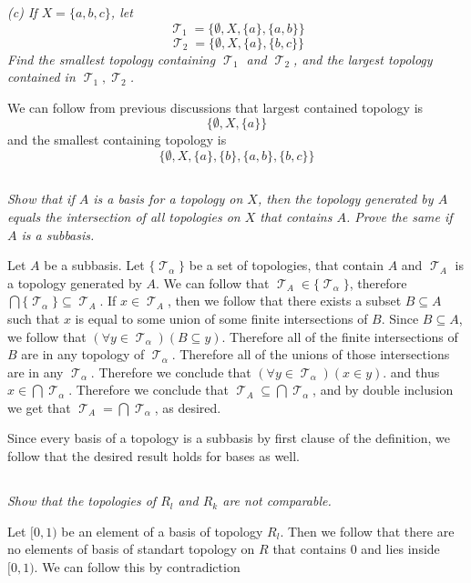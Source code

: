 \documentclass[11pt,oneside,titlepage]{book}
\DeclareMathOperator \topol {\mathcal {T}}
\newcommand{\set}[1]{\{ #1 \}}
\begin{document}
\textit{(c) If $X = \set{a, b, c}$, let
  $$\topol_1 = \set{\emptyset, X, \set{a}, \set{a, b}}$$
  $$\topol_2 = \set{\emptyset, X, \set{a}, \set{b, c}}$$
  Find the smallest topology containing $\topol_1$ and $\topol_2$, and the largest topology
  contained in $\topol_1, \topol_2$.
}

We can follow from previous discussions that largest contained topology is
$$\set{\emptyset, X, \set{a}}$$
and the smallest containing topology is
$$\set{\emptyset, X, \set{a}, \set{b}, \set{a, b}, \set{b, c}}$$

\subsection{}

\textit{Show that if $A$ is a basis for a topology on $X$, then the topology generated by $A$
  equals the intersection of all topologies on $X$ that contains $A$. Prove the same
  if $A$ is a subbasis.}

Let $A$ be a subbasis.
Let $\set{\topol_\alpha}$ be a set of topologies, that contain $A$ and  $\topol_A$ is
a topology generated by $A$. We can follow that $\topol_A \in \set{\topol_\alpha}$,
therefore $\bigcap{\set{\topol_\alpha}} \subseteq {\topol_A}$. If $x \in \topol_A$, then we
follow that there exists a subset $B \subseteq A$ such that $x$ is equal to some
union of some finite intersections of $B$. Since
$B \subseteq A$, we follow that $(\forall y \in \topol_\alpha)(B \subseteq y)$. Therefore
all of the finite intersections of $B$ are in any topology of $\topol_\alpha$.  Therefore
all of the unions of those intersections are in any $\topol_\alpha$. Therefore
we conclude that $(\forall y \in \topol_\alpha)(x \in y)$.
and thus $x \in \bigcap{\topol_\alpha}$.
Therefore we conclude that $\topol_A \subseteq  \bigcap{\topol_\alpha}$, and by double
inclusion we get that $\topol_A =  \bigcap{\topol_\alpha}$, as desired.

Since every basis of a topology is a subbasis by first clause of the definition, we follow
that the desired result holds for bases as well.

\subsection{}

\textit{Show that the topologies of $R_l$ and $R_k$ are not comparable.}

Let $[0, 1)$ be an element of a basis of topology $R_l$. Then we follow that
there are no elements of basis of standart topology on $R$ that contains $0$ and lies inside
$[0, 1)$. We can follow this by contradiction
\end{document}
